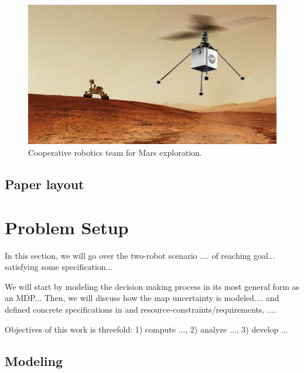 \documentclass[conference]{IEEEtran}
\begin{document}
\begin{figure}
  \begin{center}
    \includegraphics[width=0.8\columnwidth]{figs/heli-rover.png}
  \end{center}
  \caption{Cooperative robotics team for Mars exploration.}
  \label{fig:heli-rover}
\end{figure}

\subsection{Paper layout}



\section{Problem Setup}
\label{sec:problem}

In this section, we will go over the two-robot scenario .... of reaching goal... satisfying some specification...

We will start by modeling the decision making process in its most general form as an MDP... Then, we will discuss how the map uncertainty is modeled.... and defined concrete specifications in and resource-constraints/requirements, ....

Objectives of this work is threefold: 1) compute ..., 2) analyze ..., 3) develop ...

\subsection{Modeling}
\end{document}
